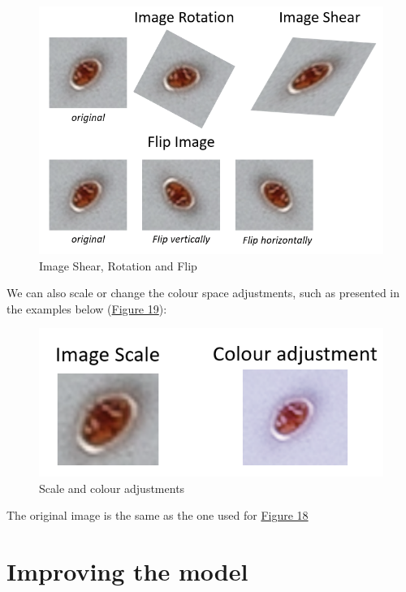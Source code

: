 \documentclass{article}
\begin{document}
\begin{figure}[!ht]
  \centering
  \includegraphics[scale=0.75]{dataset/augmentation.PNG}
  \caption{Image Shear, Rotation and Flip}
  \label{Figure 18}
\end{figure}

\bigskip

We can also scale or change the colour space adjustments, such as presented in the examples below (\hyperref[Figure 19]{Figure 19}):

\begin{figure}[!ht]
  \centering
  \includegraphics[scale=0.75]{dataset/scalecolour.PNG}
  \caption{Scale and colour adjustments}
  \label{Figure 19}
\end{figure}

The original image is the same as the one used for \hyperref[Figure 18]{Figure 18}

\newpage
\section{Improving the model}
\label{Section 4}
\end{document}
